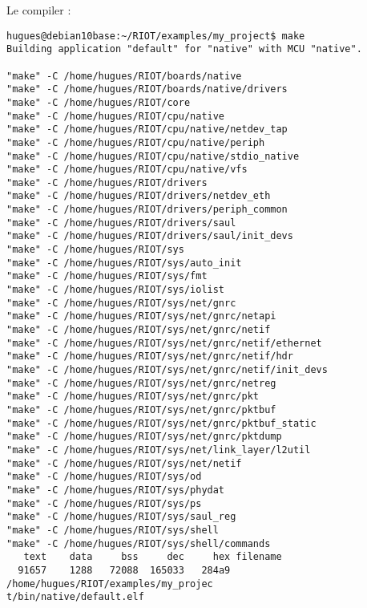 \documentclass[a4paper,12pt, twoside]{article}
\begin{document}
Le compiler :
{\small
\begin{verbatim}
hugues@debian10base:~/RIOT/examples/my_project$ make
Building application "default" for "native" with MCU "native".

"make" -C /home/hugues/RIOT/boards/native
"make" -C /home/hugues/RIOT/boards/native/drivers
"make" -C /home/hugues/RIOT/core
"make" -C /home/hugues/RIOT/cpu/native
"make" -C /home/hugues/RIOT/cpu/native/netdev_tap
"make" -C /home/hugues/RIOT/cpu/native/periph
"make" -C /home/hugues/RIOT/cpu/native/stdio_native
"make" -C /home/hugues/RIOT/cpu/native/vfs
"make" -C /home/hugues/RIOT/drivers
"make" -C /home/hugues/RIOT/drivers/netdev_eth
"make" -C /home/hugues/RIOT/drivers/periph_common
"make" -C /home/hugues/RIOT/drivers/saul
"make" -C /home/hugues/RIOT/drivers/saul/init_devs
"make" -C /home/hugues/RIOT/sys
"make" -C /home/hugues/RIOT/sys/auto_init
"make" -C /home/hugues/RIOT/sys/fmt
"make" -C /home/hugues/RIOT/sys/iolist
"make" -C /home/hugues/RIOT/sys/net/gnrc
"make" -C /home/hugues/RIOT/sys/net/gnrc/netapi
"make" -C /home/hugues/RIOT/sys/net/gnrc/netif
"make" -C /home/hugues/RIOT/sys/net/gnrc/netif/ethernet
"make" -C /home/hugues/RIOT/sys/net/gnrc/netif/hdr
"make" -C /home/hugues/RIOT/sys/net/gnrc/netif/init_devs
"make" -C /home/hugues/RIOT/sys/net/gnrc/netreg
"make" -C /home/hugues/RIOT/sys/net/gnrc/pkt
"make" -C /home/hugues/RIOT/sys/net/gnrc/pktbuf
"make" -C /home/hugues/RIOT/sys/net/gnrc/pktbuf_static
"make" -C /home/hugues/RIOT/sys/net/gnrc/pktdump
"make" -C /home/hugues/RIOT/sys/net/link_layer/l2util
"make" -C /home/hugues/RIOT/sys/net/netif
"make" -C /home/hugues/RIOT/sys/od
"make" -C /home/hugues/RIOT/sys/phydat
"make" -C /home/hugues/RIOT/sys/ps
"make" -C /home/hugues/RIOT/sys/saul_reg
"make" -C /home/hugues/RIOT/sys/shell
"make" -C /home/hugues/RIOT/sys/shell/commands
   text	   data	    bss	    dec	    hex	filename
  91657	   1288	  72088	 165033	  284a9	/home/hugues/RIOT/examples/my_projec
t/bin/native/default.elf
\end{verbatim}
}


%
%
\end{document}
